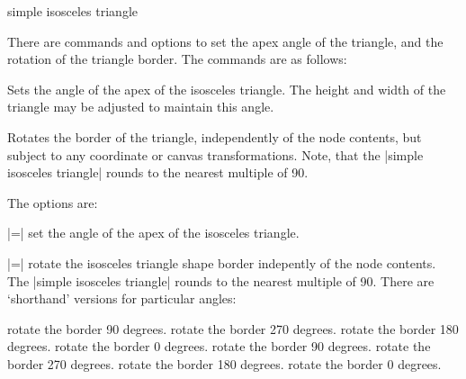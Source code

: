 \begin{shape}{simple isosceles triangle}
\begin{codeexample}[]
\end{codeexample}	

There are \pgfname{} commands and \tikzname{} options to set the 
  	apex angle of the triangle, and the rotation of the triangle border.
  	The \pgfname{} commands are as follows:
    
  \begin{command}{\pgfsettriangleapexangle{}}
    Sets the angle of the apex of the isosceles triangle. The height
    and width of the triangle may be adjusted to maintain this
    angle.
  \end{command}
  
  \begin{command}{\pgfsettrianglerotate{}}
    Rotates the border of the triangle, independently of the node contents,
    but subject to any coordinate or canvas transformations. Note, that the
    |simple isosceles triangle| rounds  to the nearest multiple of 90.
  \end{command}
  
  The \tikzname{} options are:
  
  \begin{itemize}
    |=|
    set the angle of the apex of the isosceles triangle.
    
    |=|
    rotate the isosceles triangle shape border indepently of the node contents.
    The |simple isosceles triangle| rounds  to the nearest multiple of 90.
    There are `shorthand' versions for particular angles:
    
    rotate the border 90 degrees.
    rotate the border 270 degrees.
    rotate the border 180 degrees.
    rotate the border 0 degrees.
    rotate the border 90 degrees.
    rotate the border 270 degrees.
    rotate the border 180 degrees.
    rotate the border 0 degrees.
    

\end{itemize}
\end{shape}
